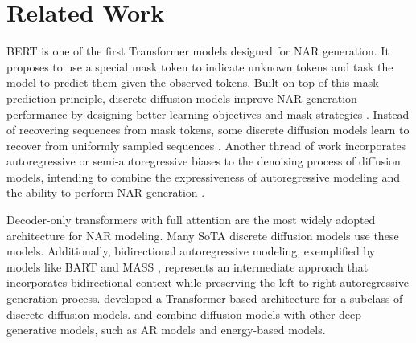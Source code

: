 \section{Related Work}
BERT \citep{devlin2018bert,warner2024smarter} is one of the first Transformer models designed for NAR generation. It proposes to use a special mask token to indicate unknown tokens and task the model to predict them given the observed tokens. Built on top of this mask prediction principle, discrete diffusion models \citep{austin2021structured} improve NAR generation performance by designing better learning objectives \citep{campbell2022continuous,lou2023discrete,sahoo2024simple} and mask strategies \citep{shi2024simplified}. Instead of recovering sequences from mask tokens, some discrete diffusion models learn to recover from uniformly sampled sequences \citep{lou2023discrete}. Another thread of work incorporates autoregressive or semi-autoregressive biases to the denoising process of diffusion models, intending to combine the expressiveness of autoregressive modeling and the ability to perform NAR generation \citep{chen2024diffusion,han2023ssd}.

Decoder-only transformers with full attention are the most widely adopted architecture for NAR modeling. Many SoTA discrete diffusion models use these models. Additionally, bidirectional autoregressive modeling, exemplified by models like BART \citep{lewis2020bart} and MASS \citep{song2019mass}, represents an intermediate approach that incorporates bidirectional context while preserving the left-to-right autoregressive generation process. \citet{sun2023score} developed a Transformer-based architecture for a subclass of discrete diffusion models. \citet{liu2025discrete} and \citet{xu2025energy} combine diffusion models with other deep generative models, such as AR models and energy-based models.